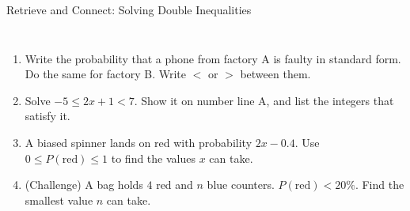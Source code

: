 \documentclass{beamer}
\newcommand{\ashow}[1]{\uncover<2->{\textcolor{red}{\small #1}}}
\newcommand{\tightlist}{%
  \setlength{\itemsep}{0pt}\setlength{\parskip}{0pt}\setlength{\topsep}{0pt}%
}
\begin{document}
\begin{frame}[t]{Retrieve and Connect: Solving Double Inequalities}
\begin{columns}[T,onlytextwidth]
\vspace{-1.5em}
\footnotesize
\begin{enumerate}\tightlist
{}
  \item Write the probability that a phone from factory A is faulty in standard form. Do
        the same for factory B. Write $<$ or $>$ between them.
        \ashow{$\tfrac{6}{3000}=2\times10^{-3}\ <\ \tfrac{10}{2000}=5\times10^{-3}$}
  \item Solve $-5\leq2x+1<7$. Show it on number line A, and list the integers that
        satisfy it.
        \ashow{$-3\leq x<3$; \; $-3,\ -2,\ -1,\ 0,\ 1,\ 2$}
  \item A biased spinner lands on red with probability $2x-0.4$. Use
        $0\leq P(\text{red})\leq1$ to find the values $x$ can take.
        \ashow{$0.4\leq2x\leq1.4$, so $0.2\leq x\leq0.7$}
  \item (Challenge) A bag holds $4$ red and $n$ blue counters. $P(\text{red})<20\%$.
        Find the smallest value $n$ can take.
        \ashow{$0.2(4+n)>4$, so $4+n>20$ and $n>16$; \; $n=17$}
\end{enumerate}
\end{columns}
\end{frame}
\end{document}
